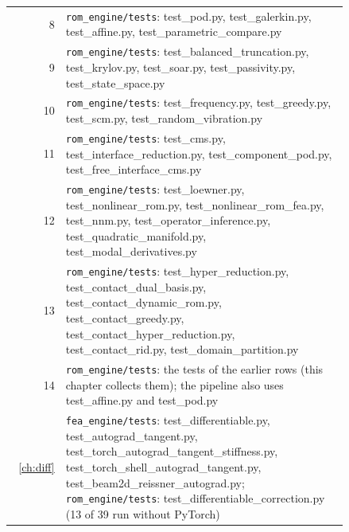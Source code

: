 \begin{longtable}{@{}r >{\raggedright\arraybackslash}p{0.84\linewidth}@{}}
8 & \texttt{rom\_engine/tests}: test\_pod.py, test\_galerkin.py, test\_affine.py, test\_parametric\_compare.py \\
9 & \texttt{rom\_engine/tests}: test\_balanced\_truncation.py, test\_krylov.py, test\_soar.py, test\_passivity.py, test\_state\_space.py \\
10 & \texttt{rom\_engine/tests}: test\_frequency.py, test\_greedy.py, test\_scm.py, test\_random\_vibration.py \\
11 & \texttt{rom\_engine/tests}: test\_cms.py, test\_interface\_reduction.py, test\_component\_pod.py, test\_free\_interface\_cms.py \\
12 & \texttt{rom\_engine/tests}: test\_loewner.py, test\_nonlinear\_rom.py, test\_nonlinear\_rom\_fea.py, test\_nnm.py, test\_operator\_inference.py, test\_quadratic\_manifold.py, test\_modal\_derivatives.py \\
13 & \texttt{rom\_engine/tests}: test\_hyper\_reduction.py, test\_contact\_dual\_basis.py, test\_contact\_dynamic\_rom.py, test\_contact\_greedy.py, test\_contact\_hyper\_reduction.py, test\_contact\_rid.py, test\_domain\_partition.py \\
14 & \texttt{rom\_engine/tests}: the tests of the earlier rows (this chapter collects them); the pipeline also uses test\_affine.py and test\_pod.py \\
\ref{ch:diff} & \texttt{fea\_engine/tests}: test\_differentiable.py, test\_autograd\_tangent.py, test\_torch\_autograd\_tangent\_stiffness.py, test\_torch\_shell\_autograd\_tangent.py, test\_beam2d\_reissner\_autograd.py; \texttt{rom\_engine/tests}: test\_differentiable\_correction.py (13 of 39 run without PyTorch) \\
\end{longtable}
